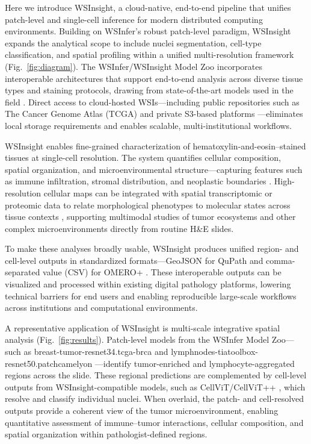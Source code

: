 \documentclass[sn-mathphys-num]{sn-jnl}%
\theoremstyle{thmstyleone}%
\theoremstyle{thmstyletwo}%
\theoremstyle{thmstylethree}%
\begin{document}
	Here we introduce WSInsight, a cloud-native, end-to-end pipeline that unifies patch-level and single-cell inference for modern distributed computing environments. Building on WSInfer’s robust patch-level paradigm, WSInsight expands the analytical scope to include nuclei segmentation, cell-type classification, and spatial profiling within a unified multi-resolution framework (Fig.~\ref{fig:diagram}). The WSInfer/WSInsight Model Zoo incorporates interoperable architectures that support end-to-end analysis across diverse tissue types and staining protocols, drawing from state-of-the-art models used in the field \cite{Pocock:2022}. Direct access to cloud-hosted WSIs—including public repositories such as The Cancer Genome Atlas (TCGA) \cite{TheCancerGenomeAtlasProgramTCGA} and private S3-based platforms \cite{CloudObjectStorage--AmazonS3--AmazonWebServices}—eliminates local storage requirements and enables scalable, multi-institutional workflows.
	
	WSInsight enables fine-grained characterization of hematoxylin-and-eosin–stained tissues at single-cell resolution. The system quantifies cellular composition, spatial organization, and microenvironmental structure—capturing features such as immune infiltration, stromal distribution, and neoplastic boundaries \cite{Page:2023}. High-resolution cellular maps can be integrated with spatial transcriptomic or proteomic data to relate morphological phenotypes to molecular states across tissue contexts \cite{Saltz:2018}, supporting multimodal studies of tumor ecosystems and other complex microenvironments directly from routine H\&E slides.
	
	To make these analyses broadly usable, WSInsight produces unified region- and cell-level outputs in standardized formats—GeoJSON for QuPath \cite{Bankhead:2017} and comma-separated value (CSV) for OMERO+ \cite{Allan:2012}. These interoperable outputs can be visualized and processed within existing digital pathology platforms, lowering technical barriers for end users and enabling reproducible large-scale workflows across institutions and computational environments.
	
	A representative application of WSInsight is multi-scale integrative spatial analysis (Fig.~\ref{fig:results}). Patch-level models from the WSInfer Model Zoo—such as breast-tumor-resnet34.tcga-brca \cite{Le:2020} and lymphnodes-tiatoolbox-resnet50.patchcamelyon \cite{Veeling:2018,Pocock:2022,Litjens:2018}—identify tumor-enriched and lymphocyte-aggregated regions across the slide. These regional predictions are complemented by cell-level outputs from WSInsight-compatible models, such as CellViT/CellViT++ \cite{Horst:2024}, which resolve and classify individual nuclei. When overlaid, the patch- and cell-resolved outputs provide a coherent view of the tumor microenvironment, enabling quantitative assessment of immune–tumor interactions, cellular composition, and spatial organization within pathologist-defined regions.
	
\end{document}
